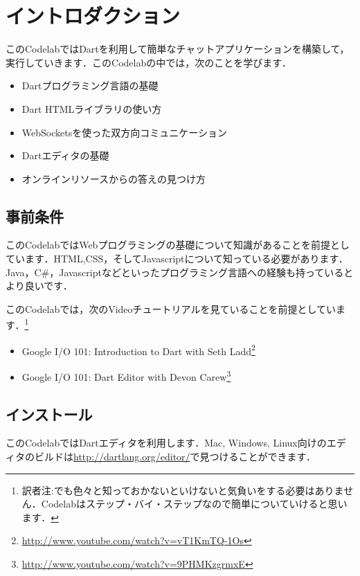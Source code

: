 \chapter*{イントロダクション}

このCodelabではDartを利用して簡単なチャットアプリケーションを構築して，実行していきます．このCodelabの中では，次のことを学びます．

\begin{itemize}
\item Dartプログラミング言語の基礎
\item Dart HTMLライブラリの使い方
\item WebSocketsを使った双方向コミュニケーション
\item Dartエディタの基礎
\item オンラインリソースからの答えの見つけ方
\end{itemize}

\section{事前条件}

このCodelabではWebプログラミングの基礎について知識があることを前提としています．HTML,CSS，そしてJavascriptについて知っている必要があります．Java，C\#，Javascriptなどといったプログラミング言語への経験も持っているとより良いです．

このCodelabでは，次のVideoチュートリアルを見ていることを前提としています．\footnote{訳者注:でも色々と知っておかないといけないと気負いをする必要はありません．Codelabはステップ・バイ・ステップなので簡単についていけると思います．}

\begin{itemize}
\item Google I/O 101: Introduction to Dart with Seth Ladd\footnote{\url{http://www.youtube.com/watch?v=vT1KmTQ-1Os}}
\item Google I/O 101: Dart Editor with Devon Carew\footnote{\url{http://www.youtube.com/watch?v=9PHMKzgrmxE}}
\end{itemize}

\section{インストール}

このCodelabではDartエディタを利用します．Mac, Windows, Linux向けのエディタのビルドは\url{http://dartlang.org/editor/}で見つけることができます．

